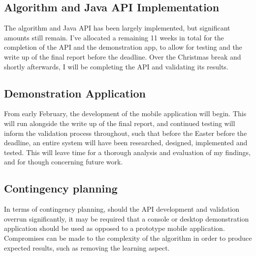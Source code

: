 \subsection{Algorithm and Java API Implementation}

The algorithm and Java API has been largely implemented, but significant amounts still remain. I've allocated a remaining 11 weeks in total for the completion of the API and the demonstration app, to allow for testing and the write up of the final report before the deadline. Over the Christmas break and shortly afterwards, I will be completing the API and validating its results. 

\subsection{Demonstration Application}

From early February, the development of the mobile application will begin. This will run alongside the write up of the final report, and continued testing will inform the validation process throughout, such that before the Easter before the deadline, an entire system will have been researched, designed, implemented and tested. This will leave time for a thorough analysis and evaluation of my findings, and for though concerning future work. 

\subsection{Contingency planning}

In terms of contingency planning, should the API development and validation overrun significantly, it may be required that a console or desktop demonstration application should be used as opposed to a prototype mobile application. Compromises can be made to the complexity of the algorithm in order to produce expected results, such as removing the learning aspect. 


